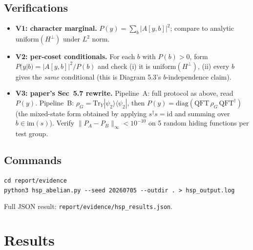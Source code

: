 \documentclass[11pt]{article}
\begin{document}
\subsection{Verifications}
\begin{itemize}
\item \textbf{V1: character marginal.} $P(y) = \sum_b |A[y,b]|^2$; compare to analytic
      $\mathrm{uniform}(H^\perp)$ under $L^2$ norm.
\item \textbf{V2: per-coset conditionals.} For each $b$ with $P(b)>0$, form
      $P(y|b) = |A[y,b]|^2 / P(b)$ and check (i) it is $\mathrm{uniform}(H^\perp)$,
      (ii) every $b$ gives the \emph{same} conditional (this is Diagram 5.3's
      $b$-independence claim).
\item \textbf{V3: paper's Sec~5.7 rewrite.} Pipeline~A: full protocol as above, read $P(y)$.
      Pipeline~B: $\rho_G = \mathrm{Tr}_Y |\psi_2\rangle\langle\psi_2|$, then $P(y) = \mathrm{diag}(\mathrm{QFT}\, \rho_G\, \mathrm{QFT}^\dagger)$
      (the mixed-state form obtained by applying $s^\dagger s = \mathrm{id}$ and summing over
      $b \in \mathrm{im}(s)$). Verify $\|P_A - P_B\|_\infty < 10^{-10}$ on 5 random
      hiding functions per test group.
\end{itemize}

\subsection{Commands}
\begin{lstlisting}
cd report/evidence
python3 hsp_abelian.py --seed 20260705 --outdir . > hsp_output.log
\end{lstlisting}
Full JSON result: \texttt{report/evidence/hsp\_results.json}.

\section{Results}
\end{document}
